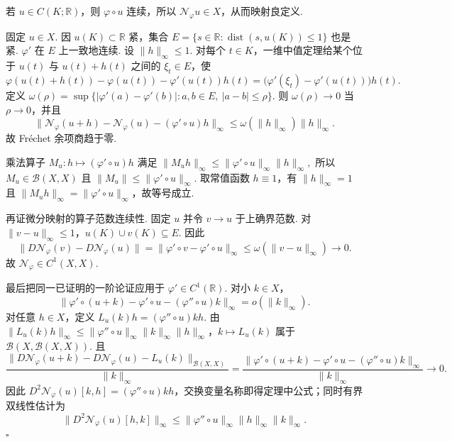 \begin{FAProof}
若 \(\displaystyle u\in C(K;\mathbb R)\)，则 \(\displaystyle\varphi\circ u\) 连续，所以 \(\displaystyle\mathcal N_{\varphi}u\in X\)，从而映射良定义.

固定 \(\displaystyle u\in X\). 因 \(\displaystyle u(K)\subset\mathbb R\) 紧，集合
\(\displaystyle E= \{s\in\mathbb R:\operatorname{dist}(s,u(K))\leqslant1\}\)
也是紧. \(\displaystyle\varphi'\) 在 \(\displaystyle E\) 上一致地连续. 设 \(\displaystyle\|h\|_{\infty}\leqslant1\). 对每个 \(\displaystyle t\in K\)，一维中值定理给某个位于 \(\displaystyle u(t)\) 与 \(\displaystyle u(t)+h(t)\) 之间的 \(\displaystyle\xi_t\in E\)，使
\[
\varphi(u(t)+h(t))-\varphi(u(t))-\varphi'(u(t))h(t)
=
\bigl(\varphi'(\xi_t)-\varphi'(u(t))\bigr)h(t).
\]
定义 \(\displaystyle\omega(\rho)=\sup\{|\varphi'(a)-\varphi'(b)|:a,b\in E,\ |a-b|\leqslant\rho\}\). 则 \(\displaystyle\omega(\rho)\to0\) 当 \(\displaystyle\rho\to0\)，并且
\[
\|\mathcal N_{\varphi}(u+h)-\mathcal N_{\varphi}(u)-(\varphi'\circ u)h\|_{\infty}
\leqslant
\omega(\|h\|_{\infty})\|h\|_{\infty}.
\]
故 Fréchet 余项商趋于零.

乘法算子 \(\displaystyle M_u:h\mapsto(\varphi'\circ u)h\) 满足
\(\displaystyle \|M_uh\|_{\infty} \leqslant \|\varphi'\circ u\|_{\infty}\|h\|_{\infty},\)
所以 \(\displaystyle M_u\in\mathcal B(X,X)\) 且 \(\displaystyle\|M_u\|\leqslant\|\varphi'\circ u\|_{\infty}\). 取常值函数 \(\displaystyle h\equiv1\)，有 \(\displaystyle\|h\|_{\infty}=1\) 且 \(\displaystyle\|M_uh\|_{\infty}=\|\varphi'\circ u\|_{\infty}\)，故等号成立.

再证微分映射的算子范数连续性. 固定 \(\displaystyle u\) 并令 \(\displaystyle v\to u\) 于上确界范数. 对 \(\displaystyle\|v-u\|_{\infty}\leqslant1\)，\(\displaystyle u(K)\cup v(K)\subseteq E\). 因此
\[
\|D\mathcal N_{\varphi}(v)-D\mathcal N_{\varphi}(u)\|
=
\|\varphi'\circ v-\varphi'\circ u\|_{\infty}
\leqslant
\omega(\|v-u\|_{\infty})
\longrightarrow0.
\]
故 \(\displaystyle\mathcal N_{\varphi}\in C^1(X,X)\).

最后把同一已证明的一阶论证应用于 \(\displaystyle\varphi'\in C^1(\mathbb R)\). 对小 \(\displaystyle k\in X\)，
\[
\|\varphi'\circ(u+k)-\varphi'\circ u-(\varphi''\circ u)k\|_{\infty}
=
o(\|k\|_{\infty}).
\]
对任意 \(\displaystyle h\in X\)，定义
\(\displaystyle L_u(k)h = (\varphi''\circ u)kh.\)
由 \(\displaystyle\|L_u(k)h\|_{\infty}\leqslant\|\varphi''\circ u\|_{\infty}\|k\|_{\infty}\|h\|_{\infty}\)，\(\displaystyle k\mapsto L_u(k)\) 属于 \(\displaystyle\mathcal B(X,\mathcal B(X,X))\). 且
\[
\frac{\|D\mathcal N_{\varphi}(u+k)-D\mathcal N_{\varphi}(u)-L_u(k)\|_{\mathcal B(X,X)}}{\|k\|_{\infty}}
=
\frac{\|\varphi'\circ(u+k)-\varphi'\circ u-(\varphi''\circ u)k\|_{\infty}}{\|k\|_{\infty}}
\longrightarrow0.
\]
因此 \(\displaystyle D^2\mathcal N_{\varphi}(u)[k,h]=(\varphi''\circ u)kh\)，交换变量名称即得定理中公式；同时有界双线性估计为
\[
\|D^2\mathcal N_{\varphi}(u)[h,k]\|_{\infty}
\leqslant
\|\varphi''\circ u\|_{\infty}\|h\|_{\infty}\|k\|_{\infty}.\]\hfill\(\square\)


\end{FAProof}

